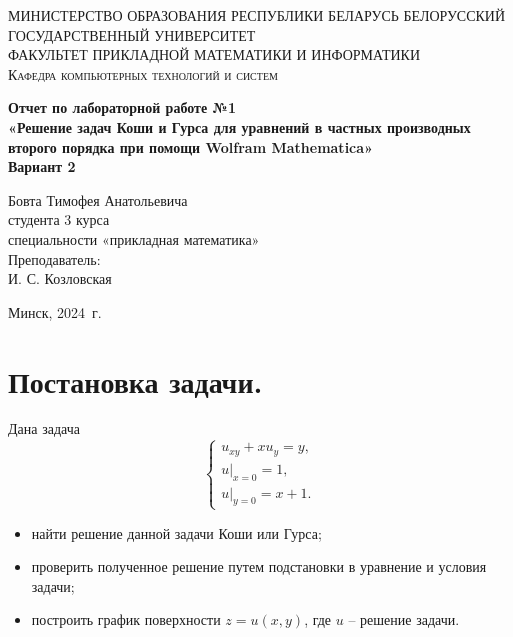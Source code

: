 \documentclass[a4paper, 12pt]{report}
\begin{document}
	\begin{titlepage}
		\begin{center}
			\textsc{МИНИСТЕРСТВО ОБРАЗОВАНИЯ РЕСПУБЛИКИ БЕЛАРУСЬ БЕЛОРУССКИЙ ГОСУДАРСТВЕННЫЙ УНИВЕРСИТЕТ
				\\[5mm]
				ФАКУЛЬТЕТ ПРИКЛАДНОЙ МАТЕМАТИКИ И ИНФОРМАТИКИ\\[2mm]
				Кафедра компьютерных технологий и систем
			}
			
			\vfill
			
			\textbf{Отчет по лабораторной работе №1\\
				«Решение задач Коши и Гурса для уравнений в частных
				производных второго порядка при помощи Wolfram
				Mathematica»\\
				Вариант 2
				\\[26mm]
			}
		\end{center}
		
		\hfill
		\begin{minipage}{.5\textwidth}
			\begin{flushright}
				Бовта Тимофея Анатольевича\\
				студента 3 курса\\
				специальности «прикладная математика»\\[5mm]
				
				Преподаватель:\\[2mm] 
				И. С. Козловская\\
			\end{flushright}
		\end{minipage}%
		\vfill
		\begin{center}
			Минск, 2024\ г.
		\end{center}
	\end{titlepage}
	\newpage
	\section*{Постановка задачи.}
	Дана задача $$\begin{cases}
		u_{xy} + xu_y =y,\\
		u|_{x=0} = 1,\\
		u|_{y=0} = x+1.
	\end{cases}$$
	\begin{itemize}
		\item найти решение данной задачи Коши или Гурса;
		\item проверить полученное решение путем подстановки в уравнение и
		условия задачи;
		\item построить график поверхности $z = u(x,y)$, где $u$ -- решение задачи.
	\end{itemize}
\end{document}
